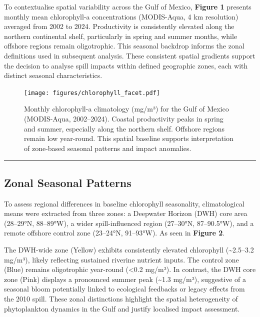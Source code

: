 \documentclass[
  11pt,
]{article}
\begin{document}
To contextualise spatial variability across the Gulf of Mexico,
\textbf{Figure 1} presents monthly mean chlorophyll-a concentrations
(MODIS-Aqua, 4 km resolution) averaged from 2002 to 2024. Productivity
is consistently elevated along the northern continental shelf,
particularly in spring and summer months, while offshore regions remain
oligotrophic. This seasonal backdrop informs the zonal definitions used
in subsequent analysis. These consistent spatial gradients support the
decision to analyse spill impacts within defined geographic zones, each
with distinct seasonal characteristics.

\begin{figure}[H]

{\centering \texttt{[image: figures/chlorophyll\_facet.pdf]}

}

\caption{Monthly chlorophyll-a climatology (mg/m³) for the Gulf of
Mexico (MODIS-Aqua, 2002--2024). Coastal productivity peaks in spring
and summer, especially along the northern shelf. Offshore regions remain
low year-round. This spatial baseline supports interpretation of
zone-based seasonal patterns and impact anomalies.}

\end{figure}%

\begin{center}\rule{0.5\linewidth}{0.5pt}\end{center}

\subsection{Zonal Seasonal Patterns}\label{zonal-seasonal-patterns}

To assess regional differences in baseline chlorophyll seasonality,
climatological means were extracted from three zones: a Deepwater
Horizon (DWH) core area (28--29°N, 88--89°W), a wider spill-influenced
region (27--30°N, 87--90.5°W), and a remote offshore control zone
(23--24°N, 91--93°W). As seen in \textbf{Figure 2}.

The DWH-wide zone (Yellow) exhibits consistently elevated chlorophyll
(\textasciitilde2.5--3.2 mg/m³), likely reflecting sustained riverine
nutrient inputs. The control zone (Blue) remains oligotrophic year-round
(\textless0.2 mg/m³). In contrast, the DWH core zone (Pink) displays a
pronounced summer peak (\textasciitilde1.3 mg/m³), suggestive of a
seasonal bloom potentially linked to ecological feedbacks or legacy
effects from the 2010 spill. These zonal distinctions highlight the
spatial heterogeneity of phytoplankton dynamics in the Gulf and justify
localised impact assessment.
\end{document}

